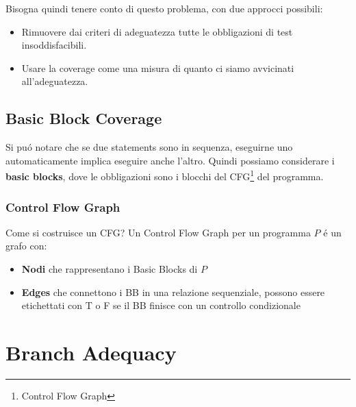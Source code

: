 Bisogna quindi tenere conto di questo problema, con due approcci possibili:
\begin{itemize}
    \item Rimuovere dai criteri di adeguatezza tutte le obbligazioni di test insoddisfacibili.
    \item Usare la coverage come una misura di quanto ci siamo avvicinati all'adeguatezza.
\end{itemize}

\subsection{Basic Block Coverage}
Si puó notare che se due statements sono in sequenza, eseguirne uno automaticamente implica eseguire anche l'altro.
Quindi possiamo considerare i \textbf{basic blocks}, dove le obbligazioni sono i blocchi del CFG\footnote{Control Flow Graph} del programma.


\subsubsection{Control Flow Graph}
Come si costruisce un CFG?
Un Control Flow Graph per un programma $P$ é un grafo con:
\begin{itemize}
    \item \textbf{Nodi} che rappresentano i Basic Blocks di $P$
    \item \textbf{Edges} che connettono i BB in una relazione sequenziale, possono essere etichettati con T o F se il BB finisce con un controllo condizionale
\end{itemize}


\section{Branch Adequacy}